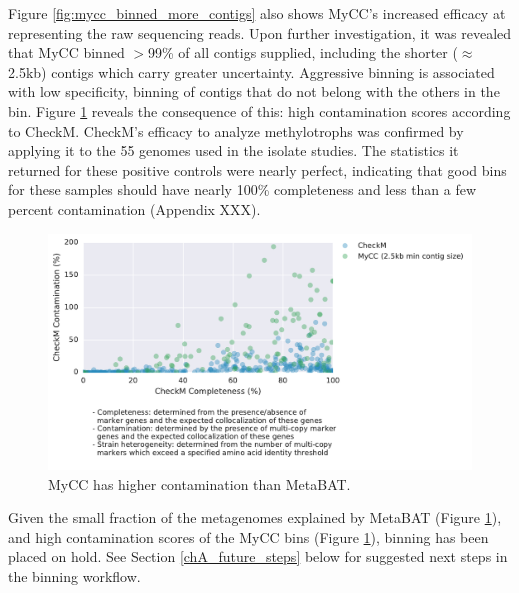 Figure \ref{fig:mycc_binned_more_contigs} also shows MyCC's increased efficacy at representing the raw sequencing reads.
Upon further investigation, it was revealed that MyCC binned $>$99\% of all contigs supplied, including the shorter ($\approx$ 2.5kb) contigs which carry greater uncertainty. %
Aggressive binning is associated with low specificity, binning of contigs that do not belong with the others in the bin.
Figure \ref{fig:mycc_contamination} reveals the consequence of this: high contamination scores according to CheckM.
CheckM's efficacy to analyze methylotrophs was confirmed by applying it to the 55 genomes used in the isolate studies.
The statistics it returned for these positive controls were nearly perfect, indicating that good bins for these samples should have nearly 100\% completeness and less than a few percent contamination (Appendix XXX).

\begin{figure}[H]
\centering
    \includegraphics[width=1.0\textwidth]{./tex/chapter2/figures/170202_MyCC_has_higher_contamination.pdf}
    \begin{singlespace}
    \caption[MyCC has higher contamination than MetaBAT]{
        MyCC has higher contamination than MetaBAT.}
    \label{fig:mycc_contamination}
    \end{singlespace}
\end{figure}

Given the small fraction of the metagenomes explained by MetaBAT (Figure \ref{fig:mycc_contamination}), and high contamination scores of the MyCC bins (Figure \ref{fig:mycc_contamination}), binning has been placed on hold.
See Section \ref{chA_future_steps} below for suggested next steps in the binning workflow.

